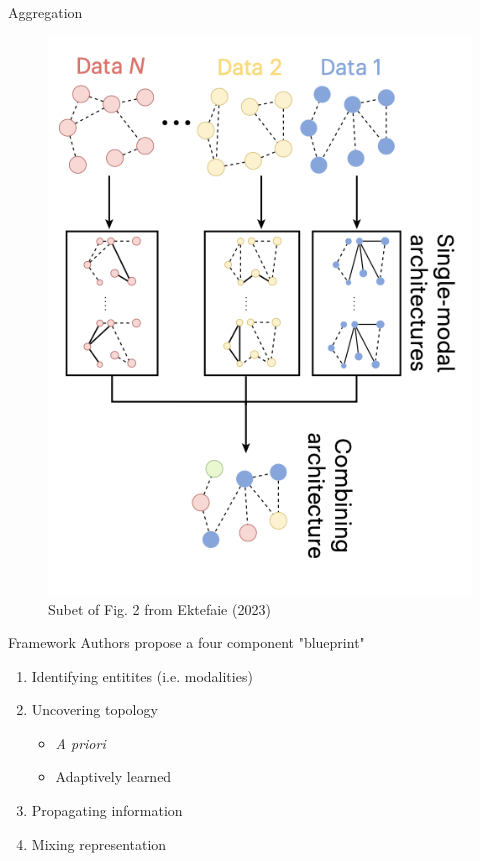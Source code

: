 \documentclass{beamer}
\begin{document}
\begin{frame}{Aggregation}
    \begin{figure}
        \centering 
        \includegraphics[scale=0.6]{Modal_Agg_Fig2.png}
        \caption{Subet of Fig. 2 from Ektefaie (2023) \cite{ektefaie_multimodal_2023}}
    \end{figure}
\end{frame}


\begin{frame}{Framework}
    Authors propose a four component "blueprint"
    \begin{enumerate}
    \item Identifying entitites (i.e. modalities)
    \item Uncovering topology 
    \begin{itemize}
        \item {\it A priori}
        \item Adaptively learned
    \end{itemize}
    \item Propagating information 
    \item Mixing representation 
    \end{enumerate}
\end{frame}
\end{document}
